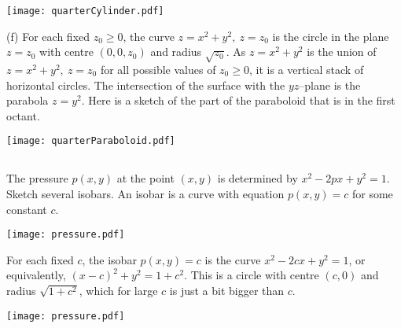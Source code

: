 \begin{solution}
\begin{center}
     \texttt{[image: quarterCylinder.pdf]}
\end{center}


(f)
For each fixed $z_0\ge 0$, the curve $z = x^2 + y^2,\ z=z_0$ is the circle in the plane $z=z_0$ with centre $(0,0,z_0)$ and radius $\sqrt{z_0}$. As 
$z = x^2 + y^2$ is the union of $z = x^2 + y^2,\ z=z_0$ for all 
possible values of $z_0\ge 0$, it is  a vertical stack of horizontal circles.
The intersection of the surface with the $yz$--plane is the parabola
$z=y^2$.  Here is a sketch of the part of the paraboloid that is in the 
first octant.

\begin{center}
     \texttt{[image: quarterParaboloid.pdf]}
\end{center}


\end{solution}




\subsection*{\Procedural}

\begin{question}
The pressure $p(x,y)$ at the point $(x,y)$ is determined by 
$x^2-2px+y^2=1$. Sketch several isobars. An isobar is a curve with
equation $p(x,y)=c$ for some constant $c$.
\end{question}

%


\begin{answer}
\begin{center}
     \texttt{[image: pressure.pdf]}
\end{center}

\end{answer}


\begin{solution}
For each fixed $c$, the isobar $p(x,y)=c$ is the curve
$x^2-2cx+y^2=1$, or equivalently, $(x-c)^2+y^2=1+c^2$. This is a 
circle with centre $(c,0)$ and radius $\sqrt{1+c^2}$, which for large $c$ is just a bit bigger than $c$.

\begin{center}
     \texttt{[image: pressure.pdf]}
\end{center}


\end{solution}


